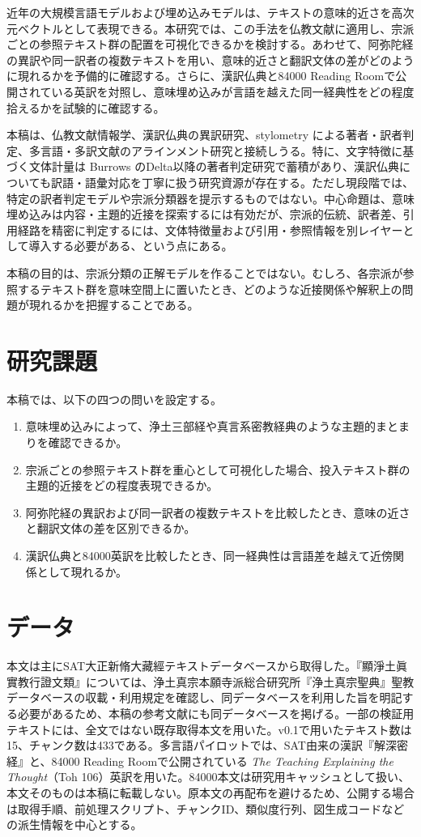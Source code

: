 \documentclass[uplatex,dvipdfmx,11pt,a4paper]{jsarticle}
\begin{document}
近年の大規模言語モデルおよび埋め込みモデルは、テキストの意味的近さを高次元ベクトルとして表現できる。本研究では、この手法を仏教文献に適用し、宗派ごとの参照テキスト群の配置を可視化できるかを検討する。あわせて、阿弥陀経の異訳や同一訳者の複数テキストを用い、意味的近さと翻訳文体の差がどのように現れるかを予備的に確認する。さらに、漢訳仏典と84000 Reading Roomで公開されている英訳を対照し、意味埋め込みが言語を越えた同一経典性をどの程度拾えるかを試験的に確認する。

本稿は、仏教文献情報学、漢訳仏典の異訳研究、stylometry による著者・訳者判定、多言語・多訳文献のアラインメント研究と接続しうる。特に、文字特徴に基づく文体計量は Burrows のDelta以降の著者判定研究で蓄積があり\cite{burrows2002,koppel2009}、漢訳仏典についても訳語・語彙対応を丁寧に扱う研究資源が存在する\cite{karashima2001}。ただし現段階では、特定の訳者判定モデルや宗派分類器を提示するものではない。中心命題は、意味埋め込みは内容・主題的近接を探索するには有効だが、宗派的伝統、訳者差、引用経路を精密に判定するには、文体特徴量および引用・参照情報を別レイヤーとして導入する必要がある、という点にある。

本稿の目的は、宗派分類の正解モデルを作ることではない。むしろ、各宗派が参照するテキスト群を意味空間上に置いたとき、どのような近接関係や解釈上の問題が現れるかを把握することである。

\section{研究課題}

本稿では、以下の四つの問いを設定する。

\begin{enumerate}
  \item 意味埋め込みによって、浄土三部経や真言系密教経典のような主題的まとまりを確認できるか。
  \item 宗派ごとの参照テキスト群を重心として可視化した場合、投入テキスト群の主題的近接をどの程度表現できるか。
  \item 阿弥陀経の異訳および同一訳者の複数テキストを比較したとき、意味の近さと翻訳文体の差を区別できるか。
  \item 漢訳仏典と84000英訳を比較したとき、同一経典性は言語差を越えて近傍関係として現れるか。
\end{enumerate}

\section{データ}

本文は主にSAT大正新脩大藏經テキストデータベースから取得した。『顯淨土眞實教行證文類』については、浄土真宗本願寺派総合研究所『浄土真宗聖典』聖教データベースの収載・利用規定を確認し、同データベースを利用した旨を明記する必要があるため、本稿の参考文献にも同データベースを掲げる。一部の検証用テキストには、全文ではない既存取得本文を用いた。v0.1で用いたテキスト数は15、チャンク数は433である。多言語パイロットでは、SAT由来の漢訳『解深密経』と、84000 Reading Roomで公開されている \textit{The Teaching Explaining the Thought}（Toh 106）英訳を用いた。84000本文は研究用キャッシュとして扱い、本文そのものは本稿に転載しない。原本文の再配布を避けるため、公開する場合は取得手順、前処理スクリプト、チャンクID、類似度行列、図生成コードなどの派生情報を中心とする。
\end{document}
